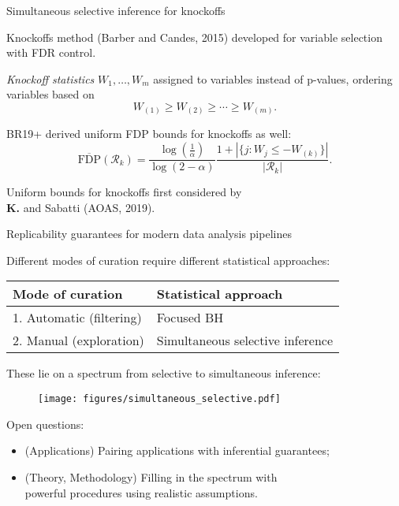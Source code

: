 \documentclass{beamer}
\begin{document}
\begin{frame}{Simultaneous selective inference for knockoffs}
	
Knockoffs method (Barber and Candes, 2015) developed for variable selection with FDR control.
\vspace{0.1in} 

\textit{Knockoff statistics} $W_1, \dots, W_m$ assigned to variables instead of p-values, ordering variables based on 
\begin{equation*}
W_{(1)} \geq W_{(2)} \geq \cdots \geq W_{(m)}.
\end{equation*}

BR19+ derived uniform FDP bounds for knockoffs as well:
\begin{equation*}
\overline{\text{FDP}}(\mathcal R_k) = \frac{\log(\frac 1 \alpha)}{\log(2-\alpha)}\frac{1 + |\{j: W_j \leq -W_{(k)}\}|}{|\mathcal R_k|}.
\end{equation*}

Uniform bounds for knockoffs first considered by \\ \textbf{K.} and Sabatti (AOAS, 2019).
	
\end{frame}



\begin{frame}{Replicability guarantees for modern data analysis pipelines}

Different modes of curation require different statistical approaches:
\vspace{0.01in}

\begin{tabular}{l|l}
Mode of curation & Statistical approach \\
\hline
1. Automatic (filtering) & Focused BH \\
2. Manual (exploration) & Simultaneous selective inference
\end{tabular}
\vspace{0.1in}

\pause 
These lie on a spectrum from selective to simultaneous inference:
\begin{center}
\begin{figure}
	\texttt{[image: figures/simultaneous\_selective.pdf]}
\end{figure}
\end{center}
\vspace{-0.05in}

\pause 

Open questions:
\begin{itemize}
	\item (Applications) Pairing applications with inferential guarantees;
	\item (Theory, Methodology) Filling in the spectrum with \\ powerful procedures using realistic assumptions.
\end{itemize}

\end{frame}
\end{document}
